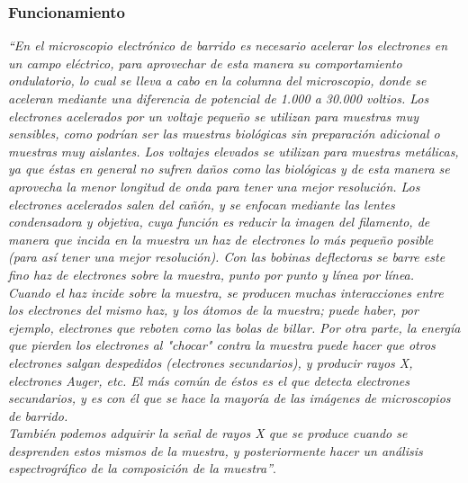 \documentclass[11pt,graphicx,caption,rotating]{article}
\begin{document}
\subsubsection{Funcionamiento}
\noindent
\textit{``En el microscopio electrónico de barrido es necesario acelerar los electrones en un campo eléctrico, para aprovechar de esta manera su comportamiento ondulatorio, lo cual se lleva a cabo en la columna del microscopio, donde se aceleran mediante una diferencia de potencial de 1.000 a 30.000 voltios. Los electrones acelerados por un voltaje pequeño se utilizan para muestras muy sensibles, como podrían ser las muestras biológicas sin preparación adicional o muestras muy aislantes. Los voltajes elevados se utilizan para muestras metálicas, ya que éstas en general no sufren daños como las biológicas y de esta manera se aprovecha la menor longitud de onda para tener una mejor resolución. Los electrones acelerados salen del cañón, y se enfocan mediante las lentes condensadora y objetiva, cuya función es reducir la imagen del filamento, de manera que incida en la muestra un haz de electrones lo más pequeño posible (para así tener una mejor resolución). Con las bobinas deflectoras se barre este fino haz de electrones sobre la muestra, punto por punto y línea por línea.\\
Cuando el haz incide sobre la muestra, se producen muchas interacciones entre los electrones del mismo haz, y los átomos de la muestra; puede haber, por ejemplo, electrones que reboten como las bolas de billar. Por otra parte, la energía que pierden los electrones al "chocar" contra la muestra puede hacer que otros electrones salgan despedidos (electrones secundarios), y producir rayos X, electrones Auger, etc. El más común de éstos es el que detecta electrones secundarios, y es con él que se hace la mayoría de las imágenes de microscopios de barrido.\\
También podemos adquirir la señal de rayos X que se produce cuando se desprenden estos mismos de la muestra, y posteriormente hacer un análisis espectrográfico de la composición de la muestra''}.
\end{document}
